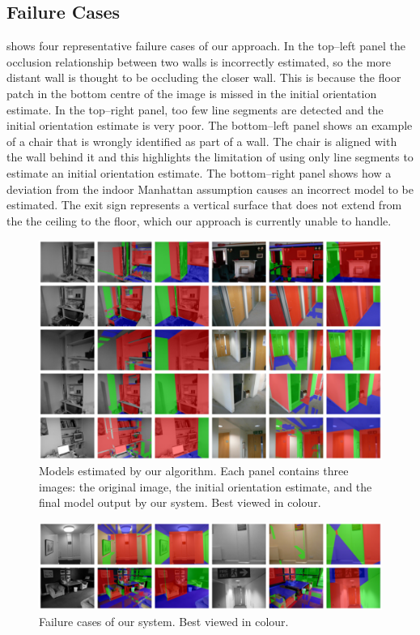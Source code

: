 \subsection{Failure Cases}

 shows four representative failure cases of our
approach. In the top--left panel the occlusion relationship between
two walls is incorrectly estimated, so the more distant wall is
thought to be occluding the closer wall. This is because the floor
patch in the bottom centre of the image is missed in the initial
orientation estimate. In the top--right panel, too few line segments
are detected and the initial orientation estimate is very poor. The
bottom--left panel shows an example of a chair that is wrongly
identified as part of a wall. The chair is aligned with the wall
behind it and this highlights the limitation of using only line
segments to estimate an initial orientation estimate. The
bottom--right panel shows how a deviation from the indoor Manhattan
assumption causes an incorrect model to be estimated. The exit sign
represents a vertical surface that does not extend from the the
ceiling to the floor, which our approach is currently unable to
handle.

\begin{figure}[tb]
\centering
\includegraphics[width=\textwidth]{figures/positive_montage}
\caption{Models estimated by our algorithm. Each panel contains three
  images: the original image, the initial orientation estimate, and
  the final model output by our system. Best viewed in colour.}
\label{fig:positive-egs}
\end{figure}

\begin{figure}[tb]
\centering
\includegraphics[width=\textwidth]{figures/failure_montage}
\caption{Failure cases of our system. Best viewed in colour.}
\label{fig:negative-egs}
\end{figure}

